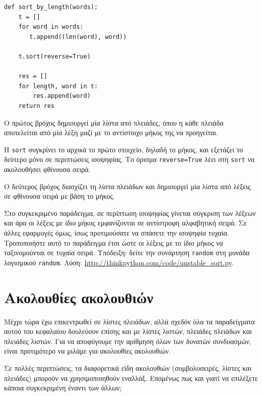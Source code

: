 \documentclass[10pt]{book}
\begin{document}
\begin{verbatim}
def sort_by_length(words):
    t = []
    for word in words:
       t.append((len(word), word))

    t.sort(reverse=True)

    res = []
    for length, word in t:
        res.append(word)
    return res
\end{verbatim}
%
Ο πρώτος βρόχος δημιουργεί μία λίστα από πλειάδες, όπου η κάθε πλειάδα αποτελείται από μία λέξη μαζί με το αντίστοιχο μήκος της να προηγείται.

Η {\tt sort} συγκρίνει το αρχικά το πρώτο στοιχείο, δηλαδή το μήκος, και εξετάζει το δεύτερο μόνο σε περιπτώσεις ισοψηφίας. Το όρισμα {\tt reverse=True} λέει στη  {\tt sort} να ακολουθήσει φθίνουσα σειρά.

Ο δεύτερος βρόχος διασχίζει τη λίστα πλειάδων και δημιουργεί μία λίστα από λέξεις σε φθίνουσα σειρά με βάση το μήκος.
\\

\begin{exercise}

Στο συγκεκριμένο παράδειγμα, σε περίπτωση ισοψηφίας γίνεται σύγκριση των λέξεων και άρα οι λέξεις με ίδιο μήκος εμφανίζονται σε αντίστροφη αλφαβητική σειρά. Σε άλλες εφαρμογές όμως, ίσως προτιμούσατε να σπάσετε την ισοψηφία τυχαία. Τροποποιήστε αυτό το παράδειγμα έτσι ώστε οι λέξεις με το ίδιο μήκος να ταξινομούνται σε τυχαία σειρά. Υπόδειξη: δείτε την συνάρτηση {\tt random} στη μονάδα λογισμικού {\tt random}. Λύση: \url{http://thinkpython.com/code/unstable_sort.py}.
\end{exercise}
 


\section{Ακολουθίες ακολουθιών}

Μέχρι τώρα έχω επικεντρωθεί σε λίστες πλειάδων, αλλά σχεδόν όλα τα παραδείγματα αυτού του κεφαλαίου δουλεύουν επίσης και με λίστες λιστών, πλειάδες πλειάδων και πλειάδες λιστών. Για να αποφύγουμε την αρίθμηση όλων των δυνατών συνδυασμών, είναι προτιμότερο να μιλάμε για ακολουθίες ακολουθιών.

Σε πολλές περιπτώσεις, τα διαφορετικά είδη ακολουθιών (συμβολοσειρές, λίστες και πλειάδες) μπορούν να χρησιμοποιηθούν εναλλάξ. Επομένως πως και γιατί να επιλέξετε κάποια συγκεκριμένη έναντι των άλλων;
\end{document}
